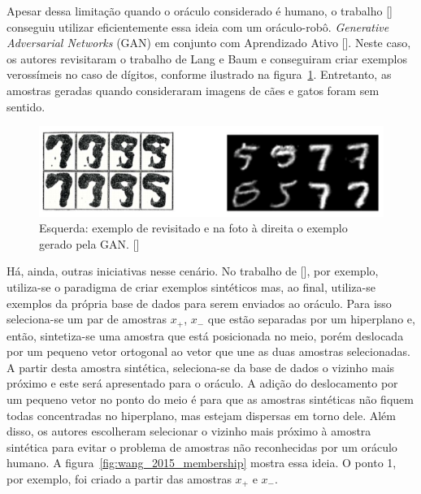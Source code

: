 Apesar dessa limitação quando o oráculo considerado é humano, o trabalho [\cite{king2004functional, king2009automation}] conseguiu utilizar eficientemente essa ideia com um oráculo-robô.  \emph{Generative Adversarial Networks} (GAN) em conjunto com Aprendizado Ativo [\cite{zhu2017generative}]. Neste caso, os autores revisitaram o trabalho de Lang e Baum e conseguiram criar exemplos verossímeis no caso de dígitos, conforme ilustrado na figura~\ref{fig:GAN_5_vs_9}. Entretanto, as amostras geradas quando consideraram imagens de cães e gatos foram sem sentido. 

\begin{figure}
  \centering
  \includegraphics[width=.9\textwidth]{figures/generative_GAN_AL_5_vs_9.png}
  \caption{Esquerda: exemplo de \cite{baum1992query} revisitado e na foto à direita o exemplo gerado pela GAN. [\cite{zhu2017generative}]}
  \label{fig:GAN_5_vs_9}
\end{figure}

Há, ainda, outras iniciativas nesse cenário. No trabalho de [\cite{wang2015active}], por exemplo, utiliza-se o paradigma de criar exemplos sintéticos mas, ao final, utiliza-se exemplos da própria base de dados para serem enviados ao oráculo. Para isso seleciona-se um par de amostras {$x_+$, $x_-$} que estão separadas por um hiperplano e, então, sintetiza-se uma amostra que está posicionada no meio, porém deslocada por um pequeno vetor ortogonal ao vetor que une as duas amostras selecionadas. A partir desta amostra sintética, seleciona-se da base de dados o vizinho mais próximo e este será apresentado para o oráculo. A adição do deslocamento por um pequeno vetor no ponto do meio é para que as amostras sintéticas não fiquem todas concentradas no hiperplano, mas estejam dispersas em torno dele. Além disso, os autores escolheram selecionar o vizinho mais próximo à amostra sintética para evitar o problema de amostras não reconhecidas por um oráculo humano. A figura~\ref{fig:wang_2015_membership}  mostra essa ideia. O ponto 1, por exemplo, foi criado a partir das amostras $x_+$ e $x_-$. %

